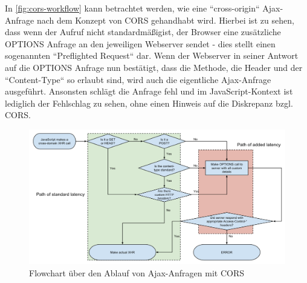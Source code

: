 In \autoref{fig:cors-workflow} kann betrachtet werden, wie eine ``cross-origin`` Ajax-Anfrage nach dem Konzept von CORS gehandhabt wird. Hierbei ist zu sehen, dass wenn der Aufruf nicht standardmäßig\footnotemark ist, der Browser eine zusätzliche OPTIONS Anfrage an den jeweiligen Webserver sendet - dies stellt einen sogenannten ``Preflighted Request`` dar. Wenn der Webserver in seiner Antwort auf die OPTIONS Anfrage nun bestätigt, dass die Methode, die Header und der ``Content-Type`` so erlaubt sind, wird auch die eigentliche Ajax-Anfrage ausgeführt. Ansonsten schlägt die Anfrage fehl und im JavaScript-Kontext ist lediglich der Fehlschlag zu sehen, ohne einen Hinweis auf die Diskrepanz bzgl. CORS.


\begin{figure}[H]
	\centering
	\includegraphics[width=\linewidth]{img/02_theorie/1280px-Flowchart_showing_Simple_and_Preflight_XHR.svg.png}
	\caption{Flowchart über den Ablauf von Ajax-Anfragen mit CORS \cite{FlowchartCORS}}
	\label{fig:cors-workflow}
\end{figure}

%
%

